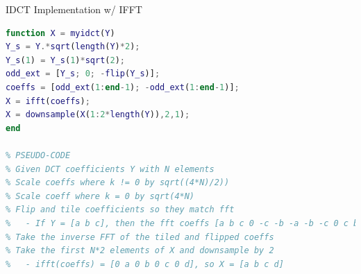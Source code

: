 \documentclass[12pt]{article}
\begin{document}
\begin{enumerate}
IDCT Implementation w/ IFFT
\begin{lstlisting}[language=matlab]
function X = myidct(Y)
Y_s = Y.*sqrt(length(Y)*2);
Y_s(1) = Y_s(1)*sqrt(2);
odd_ext = [Y_s; 0; -flip(Y_s)];
coeffs = [odd_ext(1:end-1); -odd_ext(1:end-1)];
X = ifft(coeffs);
X = downsample(X(1:2*length(Y)),2,1);
end

% PSEUDO-CODE
% Given DCT coefficients Y with N elements
% Scale coeffs where k != 0 by sqrt((4*N)/2))
% Scale coeff where k = 0 by sqrt(4*N)
% Flip and tile coefficients so they match fft
%   - If Y = [a b c], then the fft coeffs [a b c 0 -c -b -a -b -c 0 c b]
% Take the inverse FFT of the tiled and flipped coeffs
% Take the first N*2 elements of X and downsample by 2
%   - ifft(coeffs) = [0 a 0 b 0 c 0 d], so X = [a b c d]
\end{lstlisting}

\end{enumerate}
\end{document}

